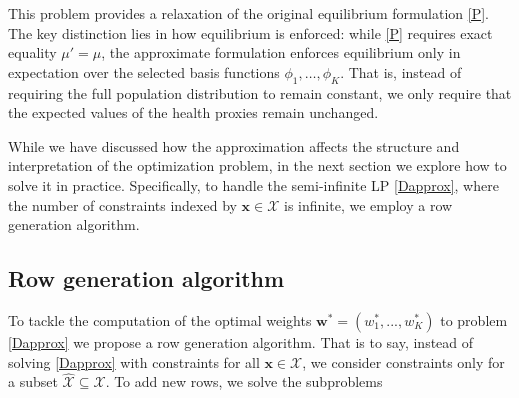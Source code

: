 \documentclass[12pt,a4paper]{article}
\newcommand{\blue}[1]{{\color{blue}{#1}}}
\newcommand{\bx}{\mathbf{x}}
\newcommand{\bw}{\mathbf{w}}
\newcommand{\mX}{\mathcal{X}}
\begin{document}
This problem provides a relaxation of the original equilibrium formulation \eqref{P}. The key distinction lies in how equilibrium is enforced: while \eqref{P} requires exact equality $\mu' = \mu$, the approximate formulation enforces equilibrium only in expectation over the selected basis functions $\phi_1, \ldots, \phi_K$. That is, instead of requiring the full population distribution to remain constant, we only require that the expected values of the health proxies remain unchanged. %

	




While we have discussed how the approximation affects the structure and interpretation of the optimization problem, in the next section we explore how to solve it in practice. Specifically, to handle the semi-infinite LP \eqref{Dapprox}, where the number of constraints indexed by $\bx \in \mathcal{X}$ is infinite, we employ a row generation algorithm. 


 

	\subsection{Row generation algorithm \label{row_gen}}
		
		To tackle the computation of the optimal weights $\bw^*=(w^*_1,...,w^*_K)$ to problem \eqref{Dapprox} we propose a row generation algorithm. That is to say, instead of solving  \eqref{Dapprox} with constraints for all $\bx \in\mX$, we consider constraints only for a subset  $ \hat{\mX} \subseteq \mX$. To add new rows, we solve the subproblems
		
\end{document}
